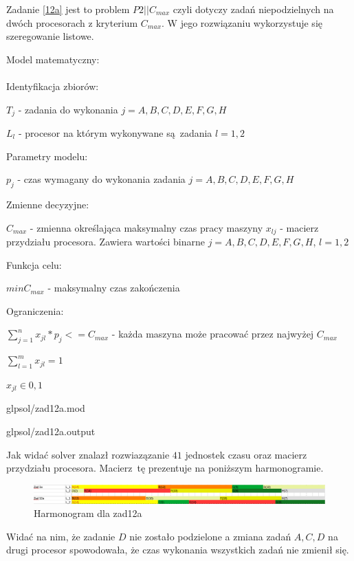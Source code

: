\documentclass{article}
\begin{document}
Zadanie \ref{12a} jest to problem $P2||C_{max}$ czyli dotyczy zadań niepodzielnych na dwóch procesorach z kryterium $C_{max}$. W jego rozwiązaniu wykorzystuje się szeregowanie listowe.

\noindent Model matematyczny: \\\\

\noindent Identyfikacja zbiorów:

$T_j$ - zadania do wykonania $j = {A,B,C,D,E,F,G,H}$

$L_{l}$ - procesor na którym wykonywane są zadania $l = {1,2}$

\noindent Parametry modelu:

$p_{j}$ - czas wymagany do wykonania zadania $j = {A,B,C,D,E,F,G,H}$

\noindent Zmienne decyzyjne:

$C_{max}$ - zmienna określająca maksymalny czas pracy maszyny
$x_{lj}$ - macierz przydziału procesora. Zawiera wartości binarne $j = {A,B,C,D,E,F,G,H}$, $l = {1,2}$ 

\noindent Funkcja celu:

$min C_{max}$ - maksymalny czas zakończenia

\noindent Ograniczenia:

$\sum^{n}_{j = 1} x_{jl} * p_j <= C_{max}$ - każda maszyna może pracować przez najwyżej $C_{max}$

$\sum^{m}_{l = 1} x_{jl} = 1$

$x_{jl} \in {0,1}$


{glpsol/zad12a.mod}


{glpsol/zad12a.output}

Jak widać solver znalazł rozwiazązanie $41$ jednostek czasu oraz macierz przydziału procesora. Macierz tę prezentuje na poniższym harmonogramie.

\begin{figure}[h]    
  \centering    
  \includegraphics[width=\linewidth]{others/zad12a_harmonogram.png}
  \caption{Harmonogram dla zad12a}
\end{figure}

Widać na nim, że zadanie $D$ nie zostało podzielone a zmiana zadań $A, C, D$ na drugi procesor spowodowała, że czas
wykonania wszystkich zadań nie zmienił się.
\end{document}
